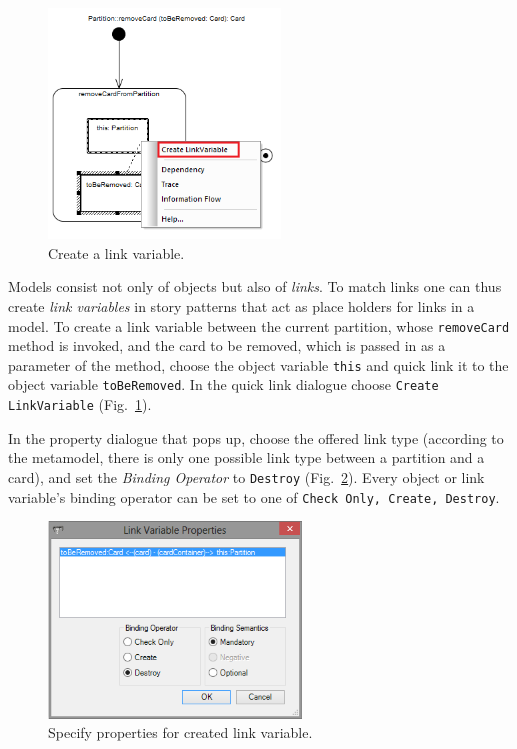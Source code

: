 \begin{figure}[htp]
\begin{center}
  \includegraphics[width=0.55\textwidth]{pics/sdmBilder/removeCard/sdm11RAW}
  \caption{Create a link variable.}   
  \label{fig:link_variable}
\end{center}
\end{figure}

Models consist not only of objects but also of \emph{links}.  
To match links one can thus create \emph{link variables} in story patterns that act as place 
holders for links in a model.  
To create a link variable between the current partition, whose \texttt{removeCard} method is invoked, and the card to be removed, which is passed in as a parameter of the method, choose the object variable \texttt{this} and quick link it to the object variable \texttt{toBeRemoved}.  
In the quick link dialogue choose \texttt{Create LinkVariable} (Fig.~\ref{fig:link_variable}).

In the property dialogue that pops up, choose the offered link type (according to the metamodel, there is only one possible link type between a partition and a 
card), and set the \emph{Binding Operator} to \texttt{Destroy} (Fig.~\ref{fig:link_variable_properties}). 
Every object or link variable's binding operator can be set to one of \texttt{Check Only, Create, Destroy}.

\begin{figure}[htp] 
\begin{center} 
 \includegraphics[width=0.6\textwidth]{pics/sdmBilder/removeCard/sdm12RAW.png}
  \caption{Specify properties for created link variable.}  
  \label{fig:link_variable_properties}
\end{center}
\end{figure}



